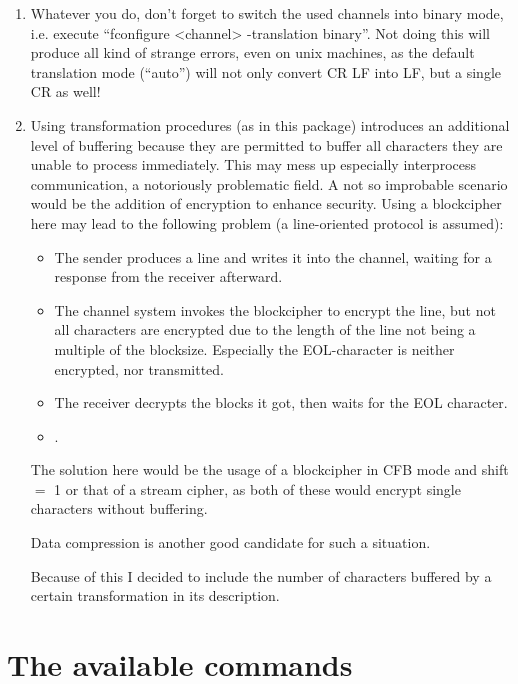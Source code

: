 \documentclass {report}
\begin{document}
\begin {enumerate}
\item	Whatever you do, don't forget to switch the used channels into
	binary mode, i.e. execute ``fconfigure <channel> -translation
	binary''. Not doing this will produce all kind of strange
	errors, even on unix machines, as the default translation mode
	(``auto'') will not only convert CR LF into LF, but a single
	CR as well!

\item	Using transformation procedures (as in this package)
	introduces an additional level of buffering because they are
	permitted to buffer all characters they are unable to process
	immediately. This may mess up especially
	interprocess communication, a notoriously problematic field. A
	not so improbable scenario would be the addition of encryption
	to enhance security. Using a blockcipher here may lead to the
	following problem (a line-oriented protocol is assumed):

	\begin {itemize}
	\item	The sender produces a line and writes it into the channel,
		waiting for a response from the receiver afterward.
	\item	The channel system invokes the blockcipher to encrypt
		the line, but not all characters are encrypted due to
		the length of the line not being a multiple of the
		blocksize. Especially the EOL-character is neither
		encrypted, nor transmitted.
	\item	The receiver decrypts the blocks it got, then waits
		for the EOL character.
	\item	{}.
	\end   {itemize}

	The solution here would be the usage of a blockcipher in CFB
	mode and shift $=$ 1 or that of a stream cipher, as both of these
	would encrypt single characters without buffering.

	Data compression is another good candidate for such a situation.

	Because of this I decided to include the number of characters
	buffered by a certain transformation in its description.

\end   {enumerate}


\chapter {The available commands}
\end{document}
